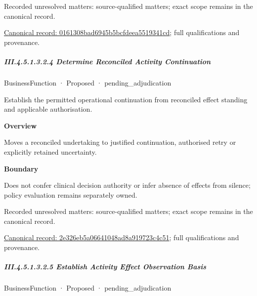 {\small Recorded unresolved matters: source-qualified matters; exact scope remains in the canonical record.}\par
{\footnotesize \href{../../../../../../../continuum/business/business-function/0161308bad6945b5bcfdeea5519341cd.md}{Canonical record: 0161308bad6945b5bcfdeea5519341cd}; full qualifications and provenance.}\par
\subparagraph*{III.4.5.1.3.2.4 Determine Reconciled Activity Continuation}
\label{navigation:III.4.5.1.3.2.4}

\label{element:2e326eb5a06641048ad8a919723c4c51}
{\small BusinessFunction · Proposed · pending\_adjudication}\par

Establish the permitted operational continuation from reconciled effect standing and applicable authorisation.



\textbf{Overview}



Moves a reconciled undertaking to justified continuation, authorised retry or explicitly retained uncertainty.



\textbf{Boundary}



Does not confer clinical decision authority or infer absence of effects from silence; policy evaluation remains separately owned.


{\small Recorded unresolved matters: source-qualified matters; exact scope remains in the canonical record.}\par
{\footnotesize \href{../../../../../../../continuum/business/business-function/2e326eb5a06641048ad8a919723c4c51.md}{Canonical record: 2e326eb5a06641048ad8a919723c4c51}; full qualifications and provenance.}\par
\subparagraph*{III.4.5.1.3.2.5 Establish Activity Effect Observation Basis}
\label{navigation:III.4.5.1.3.2.5}

\label{element:4038dd6a1baa4856afc76d7adfa6a457}
{\small BusinessFunction · Proposed · pending\_adjudication}\par

